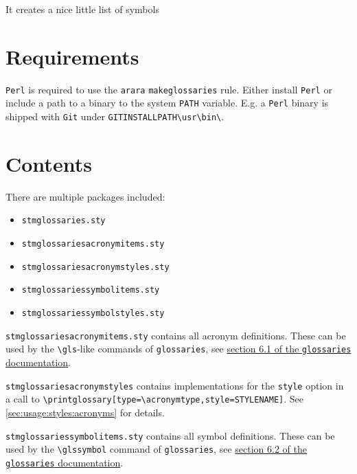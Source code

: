 \documentclass{scrartcl}
\begin{document}
It creates a nice little list of symbols

\glstocfalse
\printglossary[type=example1list  ,style=stmsymbolstyle  ,nonumberlist]
\glstoctrue

% 

\section{Requirements}
\label{sec:requirements}

\texttt{Perl} is required to use the \texttt{arara} \texttt{makeglossaries} rule. Either install \texttt{Perl} or include a path to a binary to the system \texttt{PATH} variable. E.g. a \texttt{Perl} binary is shipped with \texttt{Git} under \texttt{GITINSTALLPATH\textbackslash usr\textbackslash bin\textbackslash}.

\section{Contents}
\label{sec:contents}

There are multiple packages included:

\begin{itemize}[noitemsep]
  \item \texttt{stmglossaries.sty}
  \item \texttt{stmglossariesacronymitems.sty}
  \item \texttt{stmglossariesacronymstyles.sty}
  \item \texttt{stmglossariessymbolitems.sty}
  \item \texttt{stmglossariessymbolstyles.sty}
\end{itemize}

\texttt{stmglossariesacronymitems.sty} contains all acronym definitions. These can be used by the \texttt{\textbackslash gls}-like commands of \texttt{glossaries}, see \href{http://ftp.fau.de/ctan/macros/latex/contrib/glossaries/glossaries-user.pdf#section.6.1}{section 6.1 of the \texttt{glossaries} documentation}.

\texttt{stmglossariesacronymstyles} contains implementations for the \texttt{style} option in a call to \verb+\printglossary[type=\acronymtype,style=STYLENAME]+. See \autoref{sec:usage:styles:acronyms} for details.

\texttt{stmglossariessymbolitems.sty} contains all symbol definitions. These can be used by the \texttt{\textbackslash glssymbol} command of \texttt{glossaries}, see \href{http://ftp.fau.de/ctan/macros/latex/contrib/glossaries/glossaries-user.pdf#section.6.2}{section 6.2 of the \texttt{glossaries} documentation}.
\end{document}
